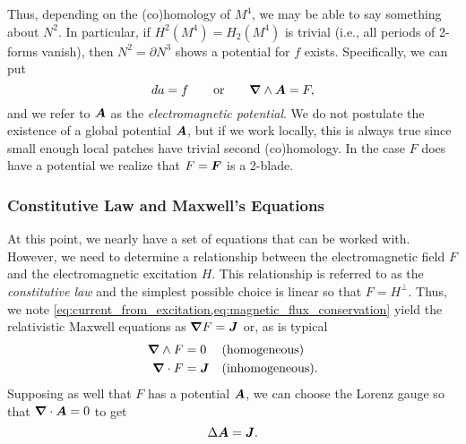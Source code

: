 \documentclass[conf]{new-aiaa}
\begin{document}
Thus, depending on the (co)homology of $M^4$, we may be able to say something about $N^2$. In particular, if $H^2(M^4)=H_2(M^4)$ is trivial (i.e., all periods of 2-forms vanish), then $N^2=\partial N^3$ shows a potential for $f$ exists. Specifically, we can put
\begin{equation}
da = f \qquad \textrm{or} \qquad \boldsymbol{\nabla} \wedge \boldsymbol{A} = F,
\end{equation}
and we refer to $\boldsymbol{A}$ as the \emph{electromagnetic potential}. We do not postulate the existence of a global potential $\boldsymbol{A}$, but if we work locally, this is always true since small enough local patches have trivial second (co)homology. In the case $F$ does have a potential we realize that $F=\boldsymbol{F}$ is a 2-blade.

\subsubsection{Constitutive Law and Maxwell's Equations}

At this point, we nearly have a set of equations that can be worked with. However, we need to determine a relationship between the electromagnetic field $F$ and the electromagnetic excitation $H$. This relationship is referred to as the \emph{constitutive law} and the simplest possible choice is linear so that $F = H^\perp$. Thus, we note \cref{eq:current_from_excitation,eq:magnetic_flux_conservation} yield the relativistic Maxwell equations as $\boldsymbol{\nabla} F = \boldsymbol{J}$ or, as is typical
\begin{align}
	\boldsymbol{\nabla} \wedge F &= 0  &&\textrm{(homogeneous)}\\
	\boldsymbol{\nabla} \cdot F &= \boldsymbol{J} && \textrm{(inhomogeneous)}.
\end{align}
Supposing as well that $F$ has a potential $\boldsymbol{A}$, we can choose the Lorenz gauge so that $\boldsymbol{\nabla} \cdot \boldsymbol{A} = 0$ to get
\begin{equation}
\Delta \boldsymbol{A} = \boldsymbol{J}.
\end{equation}
\end{document}
